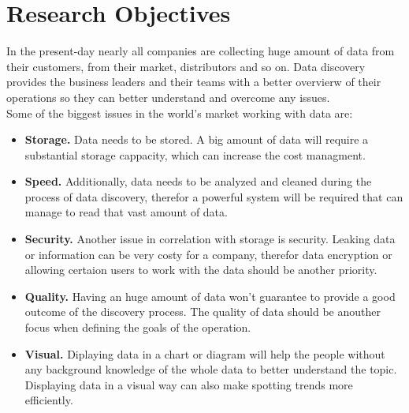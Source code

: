 \section*{Research Objectives}
In the present-day nearly all companies are collecting huge amount of data from their customers, from their market, distributors and so on. Data discovery provides the business leaders and their teams with a better overvierw of their operations so they can better understand and overcome any issues.
\vspace{5mm} %
\\ Some of the biggest issues in the world's market working with data are: 
\begin{itemize}
  \item \textbf{Storage.} Data needs to be stored. A big amount of data will require a substantial storage cappacity, which can increase the cost managment. 
  \item \textbf{Speed.} Additionally, data needs to be analyzed and cleaned during the process of data discovery, therefor a powerful system will be required that can manage to read that vast amount of data.
  \item \textbf{Security.} Another issue in correlation with storage is security. Leaking data or information can be very costy for a company, therefor data encryption or allowing certaion users to work with the data should be another priority. 
  \item \textbf{Quality.} Having an huge amount of data won't guarantee to provide a good outcome of the discovery process. The quality of data should be anouther focus when defining the goals of the operation.
  \item \textbf{Visual.} Diplaying data in a chart or diagram will help the people without any background knowledge of the whole data to better understand the topic. Displaying data in a visual way can also make spotting trends more efficiently. 
\end{itemize} 
\vspace{5mm} %

\clearpage
